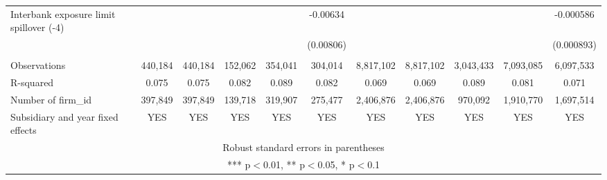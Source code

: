 \begin{tabular}{lcccccccccc}
Interbank exposure limit spillover (-4) &  &  &  &  & -0.00634 &  &  &  &  & -0.000586 \\
 &  &  &  &  & (0.00806) &  &  &  &  & (0.000893) \\
 &  &  &  &  &  &  &  &  &  &  \\
Observations & 440,184 & 440,184 & 152,062 & 354,041 & 304,014 & 8,817,102 & 8,817,102 & 3,043,433 & 7,093,085 & 6,097,533 \\
R-squared & 0.075 & 0.075 & 0.082 & 0.089 & 0.082 & 0.069 & 0.069 & 0.089 & 0.081 & 0.071 \\
Number of firm\_id & 397,849 & 397,849 & 139,718 & 319,907 & 275,477 & 2,406,876 & 2,406,876 & 970,092 & 1,910,770 & 1,697,514 \\
 Subsidiary and year fixed effects & YES & YES & YES & YES & YES & YES & YES & YES & YES & YES \\ \hline
\multicolumn{11}{c}{ Robust standard errors in parentheses} \\
\multicolumn{11}{c}{ *** p$<$0.01, ** p$<$0.05, * p$<$0.1} \\
\end{tabular}
